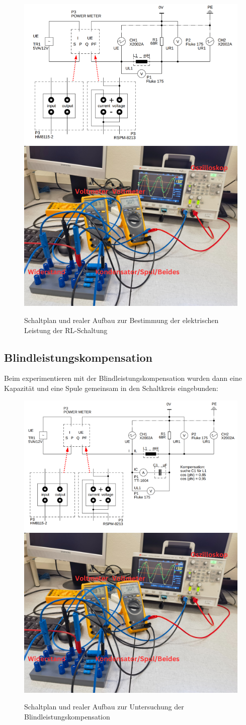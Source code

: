 \documentclass[12pt,a4paper,twoside]{article}
\begin{document}
\begin{figure}[H]
    \centering
    \includegraphics[width=0.4\linewidth]{nudes/Schaltplan6.PNG}
    \includegraphics[width=0.4\linewidth]{nudes/PhaseLeistungBilder/Aufbau5,6,7.jpg}
    \caption{Schaltplan und realer Aufbau zur Bestimmung der elektrischen Leistung der RL-Schaltung}
    \label{fig:Aufbau6}
\end{figure}



\subsection{Blindleistungskompensation}

Beim experimentieren mit der Blindleistungskompensation wurden dann eine Kapazität und eine Spule gemeinsam in den Schaltkreis eingebunden:

\begin{figure}[H]
    \centering
    \includegraphics[width=0.4\linewidth]{nudes/Schaltplan7.PNG}
    \includegraphics[width=0.4\linewidth]{nudes/PhaseLeistungBilder/Aufbau5,6,7.jpg}
    \caption{Schaltplan und realer Aufbau zur Untersuchung der Blindleistungskompensation}
    \label{fig:Aufbau7}
\end{figure}
\end{document}
